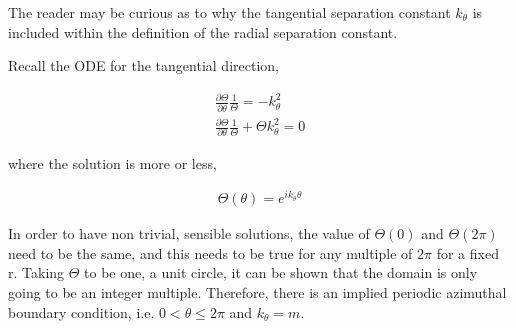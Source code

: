 \begin{frame}
    

The reader may be curious as to why the tangential separation constant $k_{\theta}$ is 
included within the definition of the radial separation constant. 

Recall the ODE for the tangential direction, 

\begin{align*}
    \frac{\partial \Theta}{\partial \theta} \frac{1}{\Theta} = - k_{\theta}^2\\
    \frac{\partial \Theta}{\partial \theta} \frac{1}{\Theta} + \Theta k_{\theta}^2 = 0 
\end{align*}

where the solution is more or less,

\begin{align*}
    \Theta(\theta) = e^{i k_{\theta} \theta}
\end{align*}

In order to have non trivial, sensible solutions, the value of $\Theta(0)$ and
$\Theta(2\pi)$ need to be the same, and this needs to be true for any multiple 
of $2\pi$ for a fixed r. Taking $\Theta$ to be one, a unit circle, it can be shown that the domain
is only going to be an integer multiple. Therefore, there is an implied periodic
azimuthal boundary condition, i.e. $0<\theta\leq 2 \pi$ and $k_{\theta}=m$. 

\end{frame}


